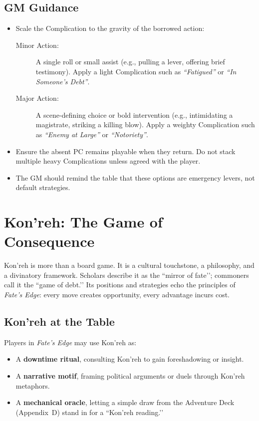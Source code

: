 \documentclass[12pt]{book}
\begin{document}
\subsection*{GM Guidance}
\begin{itemize}
  \item Scale the Complication to the gravity of the borrowed action:
    \begin{description}
      \item[Minor Action:] A single roll or small assist (e.g., pulling a lever, offering brief testimony). Apply a light Complication such as \emph{“Fatigued”} or \emph{“In Someone’s Debt”}.
      \item[Major Action:] A scene-defining choice or bold intervention (e.g., intimidating a magistrate, striking a killing blow). Apply a weighty Complication such as \emph{“Enemy at Large”} or \emph{“Notoriety”}.
    \end{description}
  \item Ensure the absent PC remains playable when they return. Do not stack multiple heavy Complications unless agreed with the player.
  \item The GM should remind the table that these options are emergency levers, not default strategies.
\end{itemize}

\section{Kon’reh: The Game of Consequence}

Kon’reh is more than a board game. It is a cultural touchstone, a philosophy, and a divinatory framework. Scholars describe it as the ``mirror of fate’’; commoners call it the ``game of debt.’’ Its positions and strategies echo the principles of \textit{Fate’s Edge}: every move creates opportunity, every advantage incurs cost.

\subsection{Kon’reh at the Table}
Players in \textit{Fate’s Edge} may use Kon’reh as:
\begin{itemize}
  \item A \textbf{downtime ritual}, consulting Kon’reh to gain foreshadowing or insight.
  \item A \textbf{narrative motif}, framing political arguments or duels through Kon’reh metaphors.
  \item A \textbf{mechanical oracle}, letting a simple draw from the Adventure Deck (Appendix~D) stand in for a ``Kon’reh reading.’’
\end{itemize}
\end{document}
